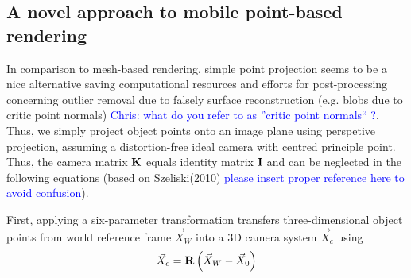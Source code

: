 \documentclass[review]{elsarticle}
\begin{document}

\subsection{A novel approach to mobile point-based rendering}
\label{sec:algorithms:pbr}
In comparison to mesh-based rendering, simple point projection seems to be a nice alternative saving computational resources and efforts for post-processing concerning outlier removal due to falsely surface reconstruction (e.g. blobs due to critic point normals) \textcolor{blue}{Chris: what do you refer to as ''critic point normals`` ?}. Thus, we simply project object points onto an image plane using perspetive projection, assuming a distortion-free ideal camera with centred principle point. Thus, the camera matrix $\bf K$ equals identity matrix $\bf I$ and can be neglected in the following equations (based on Szeliski(2010) \textcolor{blue}{please insert proper reference here to avoid confusion}). 

First, applying a six-parameter transformation transfers three-dimensional object points from world reference frame $\vec{X}_W$ into a 3D camera system $\vec{X}_c $ using
\begin{equation}
\vec{X}_c = {\bf R} \left( \vec{X}_W - \vec{X}_0 \right) 
\label{eq:projection_simple}
\end{equation} 
\end{document}
